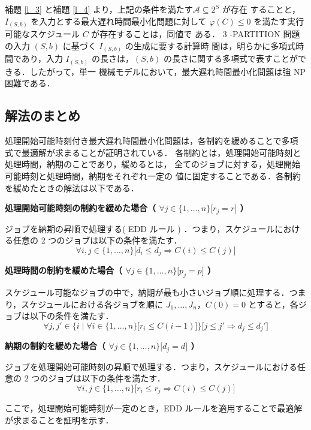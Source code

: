 \documentclass[12pt]{optlab-bachelor}
\begin{document}
補題 \ref{l_3} と補題 \ref{l_4} より，上記の条件を満たす$\mathcal{A} \subseteq 2^S$ が存在
することと，$I_{(S,b)}$ を入力とする最大遅れ時間最小化問題に対して
$\varphi(C) \le  0$
を満たす実行可能なスケジュール $C$ が存在することは，同値で
ある．
3 -PARTITION 問題の入力 $(S,b)$ に基づく $I_{(S,b)}$ の生成に要する計算時
間は，明らかに多項式時間であり，入力 $I_{(S,b)}$ の長さは，$(S, b)$
の長さに関する多項式で表すことができる．したがって，単一
機械モデルにおいて，最大遅れ時間最小化問題は強 NP 困難である．

\subsection{解法のまとめ}
処理開始可能時刻付き最大遅れ時間最小化問題は，各制約を緩めることで多項
式で最適解が求まることが証明されている．
各制約とは，処理開始可能時刻と処理時間，納期のことであり，緩めるとは，
全てのジョブに対する，処理開始可能時刻と処理時間，納期をそれぞれ一定の
値に固定することである．各制約を緩めたときの解法は以下である．

\noindent\textbf{処理開始可能時刻の制約を緩めた場合（ $\forall j \in \{1,\ldots,n\}\big[ r_j = r \big]$ ）}

ジョブを納期の昇順で処理する( EDD ルール ) ．つまり，スケジュールにおける任意の 2 つのジョブは以下の条件を満たす．
$$\forall i, j \in \{1,\ldots,n\}\big[d_i \le d_j \Rightarrow C(i) \le C(j)\big]$$


\noindent\textbf{処理時間の制約を緩めた場合（ $\forall j \in \{1,\ldots,n\}\big[ p_j = p \big]$ ）}

スケジュール可能なジョブの中で，納期が最も小さいジョブ順に処理する．つまり，スケジュールにおける各ジョブを順に $J_1,\ldots,J_n$，$C(0) = 0$ とすると，各ジョブは以下の条件を満たす．
$$\forall j, j' \in \bigg\{i \mid \forall i \in \{1,\ldots,n\}\big[r_i \le C(i - 1)\big]\bigg\}\bigg[j \le j' \Rightarrow d_j \le d_j'\bigg]$$

\noindent\textbf{納期の制約を緩めた場合（ $\forall j \in \{1,\ldots,n\}\big[ d_j = d \big]$ ）}

ジョブを処理開始可能時刻の昇順で処理する．つまり，スケジュールにおける任意の 2 つのジョブは以下の条件を満たす．
$$\forall i, j \in \{1,\ldots,n\}\big[r_i \le r_j \Rightarrow C(i) \le C(j)\big]$$

ここで，処理開始可能時刻が一定のとき，EDD ルールを適用することで最適解
が求まることを証明を示す．
\end{document}
